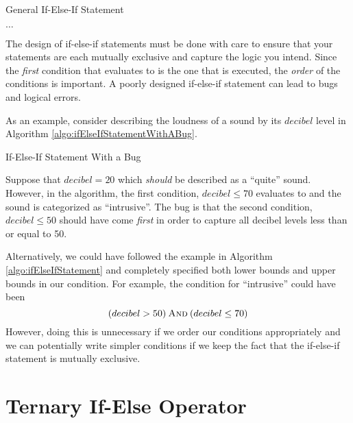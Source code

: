\begin{algorithm}[H]
\caption{General If-Else-If Statement}
\label{algo:generalIfElseIfStatement}
$\ldots$ \;
\end{algorithm}

The design of if-else-if statements must be done with care to ensure
that your statements are each mutually exclusive and capture the logic
you intend.  Since the \emph{first} condition that evaluates to \True is
the one that is executed, the \emph{order} of the conditions is important.
A poorly designed if-else-if statement can lead to \glspl{bug} and logical
errors.  

As an example, consider describing the loudness of a sound by its
$decibel$ level in Algorithm \ref{algo:ifElseIfStatementWithABug}.

\begin{algorithm}[H]
\caption{If-Else-If Statement With a Bug}
\label{algo:ifElseIfStatementWithABug}
\end{algorithm}

Suppose that $decibel = 20$ which \emph{should} be described as a
``quite'' sound.  However, in the algorithm, the first condition, $decibel \leq 70$
evaluates to \True and the sound is categorized as ``intrusive''.  The
bug is that the second condition, $decibel \leq 50$ should have come 
\emph{first} in order to capture all decibel levels less than or equal to 50.

Alternatively, we could have followed the example in Algorithm \ref{algo:ifElseIfStatement}
and completely specified both lower bounds and upper bounds in our condition.  
For example, the condition for ``intrusive'' could have been 
  $$(decibel > 50) \mathbin{\textsc{And}} (decibel \leq 70)$$
However, doing this is unnecessary if we order our conditions appropriately 
and we can potentially write simpler conditions if we keep the fact that the
if-else-if statement is mutually exclusive.

\section{Ternary If-Else Operator}

